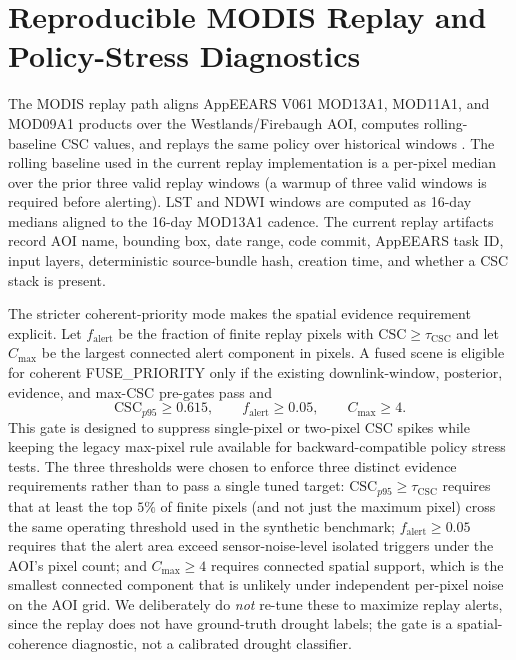 \documentclass[11pt]{article}
\begin{document}
\section{Reproducible MODIS Replay and Policy-Stress Diagnostics}

The MODIS replay path aligns AppEEARS V061 MOD13A1, MOD11A1, and MOD09A1 products over the Westlands/Firebaugh AOI, computes rolling-baseline CSC values, and replays the same policy over historical windows \cite{mod13a1,mod11a1,mod09a1,mod09-guide}. The rolling baseline used in the current replay implementation is a per-pixel median over the prior three valid replay windows (a warmup of three valid windows is required before alerting). LST and NDWI windows are computed as 16-day medians aligned to the 16-day MOD13A1 cadence. The current replay artifacts record AOI name, bounding box, date range, code commit, AppEEARS task ID, input layers, deterministic source-bundle hash, creation time, and whether a CSC stack is present.

The stricter coherent-priority mode makes the spatial evidence requirement explicit. Let $f_\mathrm{alert}$ be the fraction of finite replay pixels with $\mathrm{CSC}\geq\tau_\mathrm{CSC}$ and let $C_\mathrm{max}$ be the largest connected alert component in pixels. A fused scene is eligible for coherent FUSE\_PRIORITY only if the existing downlink-window, posterior, evidence, and max-CSC pre-gates pass and
\[
\mathrm{CSC}_{p95} \geq 0.615,\qquad
f_\mathrm{alert} \geq 0.05,\qquad
C_\mathrm{max} \geq 4.
\]
This gate is designed to suppress single-pixel or two-pixel CSC spikes while keeping the legacy max-pixel rule available for backward-compatible policy stress tests. The three thresholds were chosen to enforce three distinct evidence requirements rather than to pass a single tuned target: $\mathrm{CSC}_{p95}\geq\tau_\mathrm{CSC}$ requires that at least the top $5\%$ of finite pixels (and not just the maximum pixel) cross the same operating threshold used in the synthetic benchmark; $f_\mathrm{alert}\geq 0.05$ requires that the alert area exceed sensor-noise-level isolated triggers under the AOI's pixel count; and $C_\mathrm{max}\geq 4$ requires connected spatial support, which is the smallest connected component that is unlikely under independent per-pixel noise on the AOI grid. We deliberately do \emph{not} re-tune these to maximize replay alerts, since the replay does not have ground-truth drought labels; the gate is a spatial-coherence diagnostic, not a calibrated drought classifier.
\end{document}
